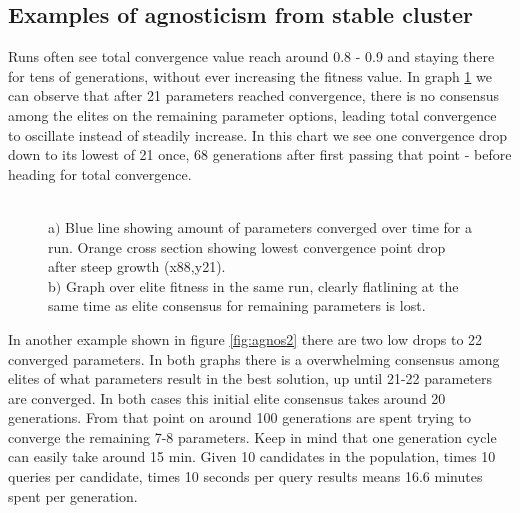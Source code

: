 \documentclass[a4paper,english]{report}
\begin{document}
		\subsection{Examples of agnosticism from stable cluster }
		\label{sec:agnosstable}
		Runs often see total convergence value reach around 0.8 - 0.9  and staying there for tens of generations, without ever increasing the fitness value. In graph \ref{fig:agnos} we can observe that after 21 parameters reached convergence, there is no consensus among the elites on the remaining parameter options, leading total convergence to oscillate instead of steadily increase. In this chart we see one convergence drop down to its lowest of 21 once, 68 generations after first passing that point - before heading for total convergence.
		\begin{figure}[H]
			\centering
			\qquad
			\caption{\\a$)$ Blue line showing amount of parameters converged over time for a run. Orange cross section showing lowest convergence point drop after steep growth (x88,y21).\\b$)$ Graph over elite fitness in the same run, clearly flatlining at the same time as elite consensus for remaining parameters is lost.}
			\label{fig:agnos}
		\end{figure}
		\clearpage
		In another example shown in figure \ref{fig:agnos2} there are two low drops to 22 converged parameters. In both graphs there is a overwhelming consensus among elites of what parameters result in the best solution, up until 21-22 parameters are converged. In both cases this initial elite consensus takes around 20 generations. From that point on around 100 generations are spent trying to converge the remaining 7-8 parameters. Keep in mind that one generation cycle can easily take around 15 min. Given 10 candidates in the population, times 10 queries per candidate, times 10 seconds per query results means 16.6 minutes spent per generation.
\end{document}
